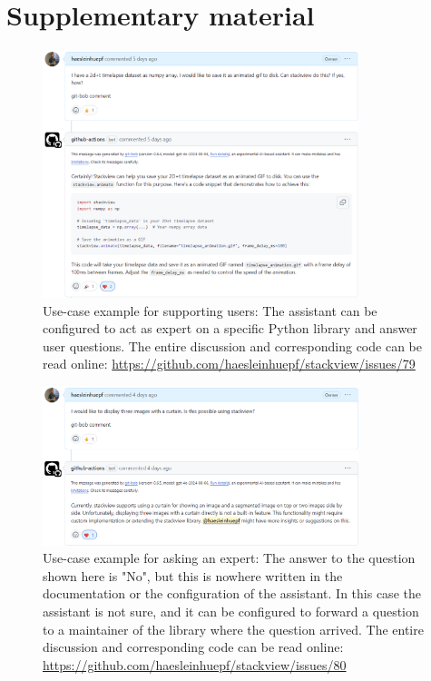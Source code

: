\documentclass{ecai}
\begin{document}
\section{Supplementary material}
\setcounter{figure}{0} 
\renewcommand{\thefigure}{S\arabic{figure}}




\begin{figure}[h]
\centering
\includegraphics[width=0.82\textwidth]{example_supporting_users.png}
\caption{Use-case example for supporting users: The assistant can be configured to act as expert on a specific Python library and answer user questions. The entire discussion and corresponding code can be read online: \url{https://github.com/haesleinhuepf/stackview/issues/79}
\newline
\newline
}
\label{fig:examplesupportingusers}
\end{figure}


\begin{figure}[h]
\centering
\includegraphics[width=0.82\textwidth]{example_supporting_users2.png}
\caption{Use-case example for asking an expert: The answer to the question shown here is "No", but this is nowhere written in the documentation or the configuration of the assistant. In this case the assistant is not sure, and it can be configured to forward a question to a maintainer of the library where the question arrived. The entire discussion and corresponding code can be read online: \url{https://github.com/haesleinhuepf/stackview/issues/80}
\newline
\newline
}
\label{fig:examplesupportingusers2}
\end{figure}
\end{document}
